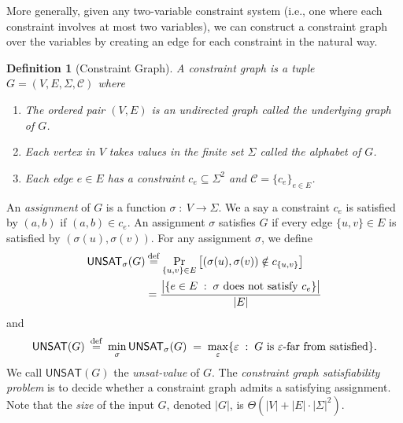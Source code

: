 \documentclass{article}
\newtheorem{definition}[theorem]{Definition}
\newcommand{\class}[1]{\mathbf{#1}}
\newcommand{\NP}{\class{NP}}
\newcommand{\UNSAT}{\mathsf{UNSAT}}
\newcommand{\eqdef}{\mathbin{\stackrel{\rm def}{=}}}
\begin{document}
More generally, given any two-variable constraint system (i.e., one where each
constraint involves at most two variables), we can construct a constraint graph
over the variables by creating an edge for each constraint in the natural way.



\begin{definition}[Constraint Graph] A constraint graph is a tuple
$G = (V, E, \Sigma, \mathcal{C})$ where
\begin{enumerate}
\item The ordered pair $(V, E)$ is an undirected graph called the underlying
  graph of $G$.
\item Each vertex in $V$ takes values in the finite set $\Sigma$
  called the alphabet of $G$.
\item Each edge $e \in E$ has a constraint $c_e \subseteq \Sigma^2$ and
  $\mathcal{C} = \{c_e\}_{e \in E}$.
\end{enumerate}
\end{definition}

An \emph{assignment} of $G$ is a function $\sigma \;:\: V \to \Sigma$.
We a say a constraint $c_e$ is satisfied by $(a, b)$ if $(a, b) \in c_e$. 
An assignment $\sigma$ satisfies $G$ if every edge $\{u, v\} \in E$
is satisfied by $(\sigma(u), \sigma(v))$.
For any assignment $\sigma$, we define
\begin{align*}
\UNSAT_\sigma(G) &\eqdef \Pr_{\{u, v\} \in E} \big[(\sigma(u), \sigma(v)) \notin c_{\{u, v\}}\big] \\
  &= \frac{\big|\{e \in E \;:\; \sigma \text{ does not satisfy } c_e\}\big|}{|E|}
\end{align*}
and
\begin{align*}
\UNSAT(G) \;\eqdef\; \min_\sigma \UNSAT_\sigma(G)
  \;=\; \max_\varepsilon \{\varepsilon \;:\; G \text{ is } \varepsilon\text{-far from satisfied} \}.
\end{align*}
We call $\UNSAT(G)$ the \emph{unsat-value} of $G$.
The \emph{constraint graph satisfiability problem} is to decide whether
a constraint graph admits a satisfying assignment.
Note that the \emph{size} of the input $G$, denoted $|G|$, is $\Theta(|V|+|E|\cdot|\Sigma|^2)$.
\end{document}
